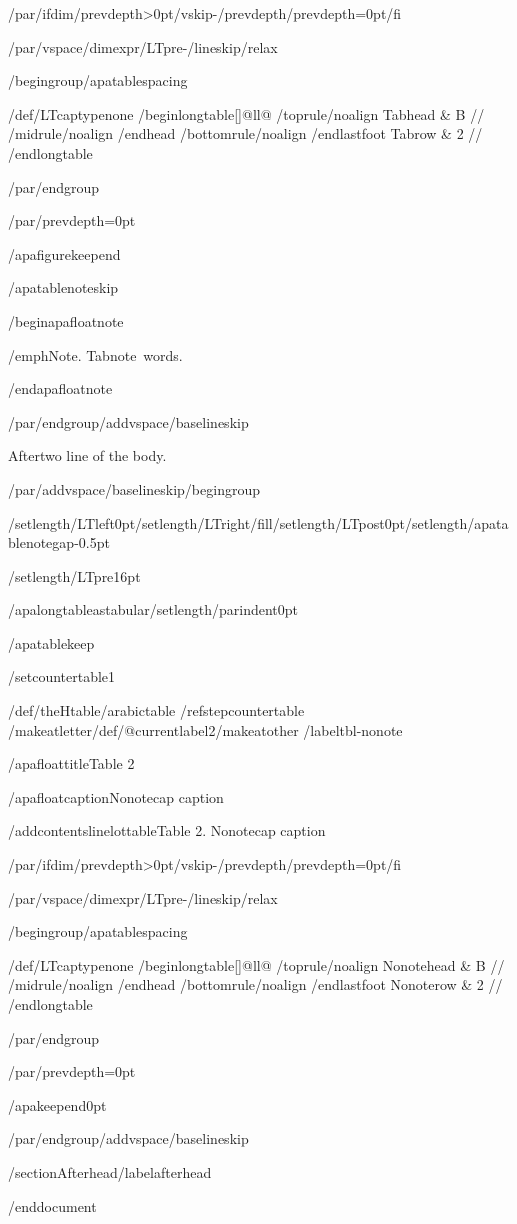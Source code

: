 /par/ifdim/prevdepth>0pt/vskip-/prevdepth/prevdepth=0pt/fi

/par/vspace{/dimexpr/LTpre-/lineskip/relax}

/begingroup/apatablespacing

{/def/LTcaptype{none} %
/begin{longtable}[]{@{}ll@{}}
/toprule/noalign{}
Tabhead & B //
/midrule/noalign{}
/endhead
/bottomrule/noalign{}
/endlastfoot
Tabrow & 2 //
/end{longtable}
}

/par/endgroup

/par/prevdepth=0pt

/apafigurekeepend

/apatablenoteskip

/begin{apafloatnote}

/emph{Note}. Tabnote~words.

/end{apafloatnote}

/par/endgroup/addvspace{/baselineskip}

Aftertwo line of the body.

/par/addvspace{/baselineskip}/begingroup

/setlength{/LTleft}{0pt}/setlength{/LTright}{/fill}/setlength{/LTpost}{0pt}/setlength{/apatablenotegap}{-0.5pt}

/setlength{/LTpre}{16pt}

/apalongtableastabular/setlength{/parindent}{0pt}

/apatablekeep

/setcounter{table}{1}

/def/theHtable{/arabic{table}}%
/refstepcounter{table}%
/makeatletter/def/@currentlabel{2}/makeatother%
/label{tbl-nonote}

/apafloattitle{Table 2}

/apafloatcaption{Nonotecap caption}

/addcontentsline{lot}{table}{Table 2. Nonotecap caption}

/par/ifdim/prevdepth>0pt/vskip-/prevdepth/prevdepth=0pt/fi

/par/vspace{/dimexpr/LTpre-/lineskip/relax}

/begingroup/apatablespacing

{/def/LTcaptype{none} %
/begin{longtable}[]{@{}ll@{}}
/toprule/noalign{}
Nonotehead & B //
/midrule/noalign{}
/endhead
/bottomrule/noalign{}
/endlastfoot
Nonoterow & 2 //
/end{longtable}
}

/par/endgroup

/par/prevdepth=0pt

/apakeepend{0pt}

/par/endgroup/addvspace{/baselineskip}

/section{Afterhead}/label{afterhead}




/end{document}
